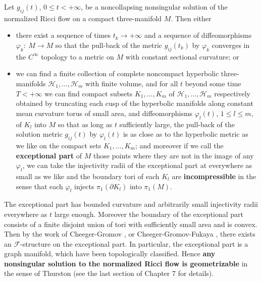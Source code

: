 \begin{theorem}
  \label{thm:cz-noncollapsing-nonsingular-flow-structure}

Let $g_{ij}(t)$, $0\leq t<+\infty$, be a noncollapsing nonsingular
solution of the normalized Ricci flow on a compact three-manifold
$M$. Then either
\begin{itemize}
\item[(i)] there exist a sequence of times $t_k\rightarrow+\infty$
and a sequence of diffeomorphisms $\varphi_k:\ M\rightarrow M$ so
that the pull-back of the metric $g_{ij}(t_k)$ by $\varphi_k$
converges in the $C^\infty$ topology to a metric on $M$ with
constant sectional curvature; or \item[(ii)] we can find a finite
collection of complete noncompact hyperbolic three-manifolds
$\mathcal{H}_1,\ldots,\mathcal{H}_m$ with finite volume, and for
all $t$ beyond some time $T<+\infty$ we can find compact subsets
$K_1,\ldots,K_m$ of $\mathcal{H}_1,\ldots,\mathcal{H}_m$
respectively obtained by truncating each cusp of the hyperbolic
manifolds along constant mean curvature torus of small area, and
diffeomorphisms $\varphi_l(t)$, $1\leq l\leq m$, of $K_l$ into $M$
so that as long as $t$ sufficiently large, the pull-back of the
solution metric $g_{ij}(t)$ by $\varphi_l(t)$ is as close as to
the hyperbolic metric as we like on the compact sets
$K_1,\ldots,K_m$; and moreover if we call the \textbf{exceptional
part} of $M$ those points where they are not in the image of any
$\varphi_l$, we can take the injectivity radii of the exceptional
part at everywhere as small as we like and the boundary tori of
each $K_l$ are \textbf{incompressible} in the sense that each
$\varphi_l$ injects $\pi_1(\partial K_l)$ into $\pi_1(M)$.
 
\end{itemize}
\end{theorem}

\begin{remark}
  \label{rem:cz-exceptional-long-time-region-geometry}

The exceptional part has bounded curvature and arbitrarily small
injectivity radii everywhere as $t$ large enough. Moreover the
boundary of the exceptional part consists of a finite disjoint
union of tori with sufficiently small area and is convex. Then by
the work of Cheeger-Gromov \cite{ChG86}, \cite{ChG90} or
Cheeger-Gromov-Fukaya \cite{CGF92}, there exists an
$\mathcal{F}$-structure on the exceptional part. In particular,
the exceptional part is a graph manifold, which have been
topologically classified. Hence \textbf{any nonsingular solution
to the normalized Ricci flow is geometrizable} in the sense of
Thurston (see the last section of Chapter 7 for details).
\end{remark}

